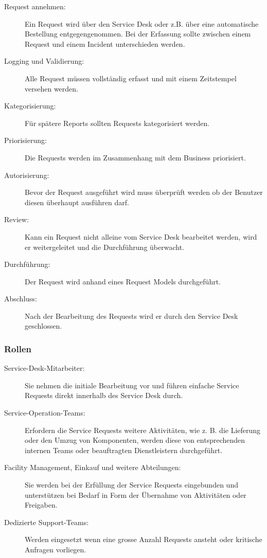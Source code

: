 \begin{description}
	\item[Request annehmen:] Ein Request wird über den Service Desk oder z.B. über eine automatische Bestellung entgegengenommen. Bei der Erfassung sollte zwischen einem Request und einem Incident unterschieden werden.
	\item[Logging und Validierung:] Alle Request müssen vollständig erfasst und mit einem Zeitstempel versehen werden.
	\item[Kategorisierung:] Für spätere Reports sollten Requests kategorisiert werden.
	\item[Priorisierung:] Die Requests werden im Zusammenhang mit dem Business priorisiert.
	\item[Autorisierung:] Bevor der Request ausgeführt wird muss überprüft werden ob der Benutzer diesen überhaupt ausführen darf.
	\item[Review:] Kann ein Request nicht alleine vom Service Desk bearbeitet werden, wird er weitergeleitet und die Durchführung überwacht.
	\item[Durchführung:] Der Request wird anhand eines Request Models durchgeführt.
	\item[Abschluss:] Nach der Bearbeitung des Requests wird er durch den Service Desk geschlossen.
\end{description}

\subsubsection{Rollen}

\begin{description}
	\item[Service-Desk-Mitarbeiter:] Sie nehmen die initiale Bearbeitung vor und führen einfache Service Requests direkt innerhalb des Service Desk durch.
	\item[Service-Operation-Teams:] Erfordern die Service Requests weitere Aktivitäten, wie z. B. die Lieferung oder den Umzug von Komponenten, werden diese von entsprechenden internen Teams oder beauftragten Dienstleistern durchgeführt.
	\item[Facility Management, Einkauf und weitere Abteilungen:] Sie werden bei der Erfüllung der Service Requests eingebunden und unterstützen bei Bedarf in Form der Übernahme von Aktivitäten oder Freigaben.
	\item[Dedizierte Support-Teams:] Werden eingesetzt wenn eine grosse Anzahl Requests ansteht oder kritische Anfragen vorliegen.
\end{description}

